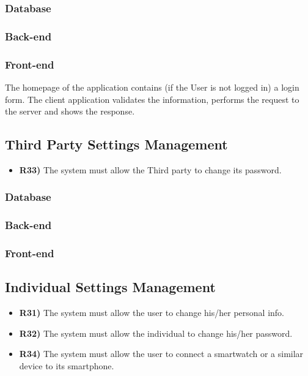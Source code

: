 \subsubsection*{Database}


\subsubsection*{Back-end}


\subsubsection*{Front-end}
The homepage of the application contains (if the User is not logged in) a login form. The client application validates the information, performs the request to the server and shows the response.


\subsection{Third Party Settings Management}
\begin{itemize}
	\item {\color{Green}\textbf{R33)}} The system must allow the Third party to change its password.
\end{itemize}
\subsubsection*{Database}


\subsubsection*{Back-end}


\subsubsection*{Front-end}

\subsection{Individual Settings Management}
\begin{itemize}	
	\item {\color{Red}\textbf{R31)}} The system must allow the user to change his/her personal info.
	\item {\color{Green}\textbf{R32)}} The system must allow the individual to change his/her password.
	\item {\color{Red}\textbf{R34)}} The system must allow the user to connect a smartwatch or a similar device to its smartphone.
\end{itemize}
